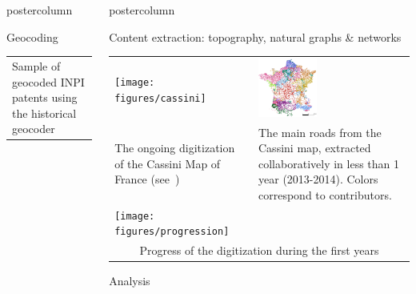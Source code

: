 \documentclass[final,hyperref={pdfpagelabels=false}]{beamer}
\let\oldcite=\cite
\renewcommand{\cite}[1]{\textcolor{ta3chameleon}{\oldcite{#1}}}
\begin{document}
\begin{frame}
\begin{columns}
\begin{column}{0.5\textwidth}
\begin{beamercolorbox}[center,wd=\textwidth]{postercolumn}
\begin{minipage}[t]{.98\textwidth}
\begin{block}{Geocoding}
\begin{tabular}{>{\centering}m{}}
          Sample of geocoded INPI patents using the historical geocoder~\cite{Cura2018}
        \end{tabular}
      \end{block}
    \end{minipage}
    \end{beamercolorbox}
    \end{column}
    \begin{column}{0.5\textwidth}
    \begin{beamercolorbox}[center,wd=\textwidth]{postercolumn}
    \begin{minipage}[t]{.98\textwidth}
      \begin{block}{Content extraction: topography, natural graphs \& networks}
        \begin{tabular}{p{}p{}}
	  \texttt{[image: figures/cassini]}&
          \includegraphics[width=0.4\textwidth]{figures/contrib}\\
          The ongoing digitization of the Cassini Map of France (see~\cite{Perret2015_,Perret2015Data_})&
          The main roads from the Cassini map, extracted collaboratively in less than 1 year (2013-2014). Colors correspond to contributors.\\
          \texttt{[image: figures/progression]}\\
          \multicolumn{2}{c}{Progress of the digitization during the first years}\\
        \end{tabular}
      \end{block}
      \begin{block}{Analysis}
      
      

\end{block}
\end{minipage}
\end{beamercolorbox}
\end{column}
\end{columns}
\end{frame}
\end{document}
